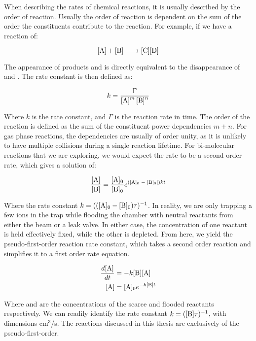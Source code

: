 When describing the rates of chemical reactions, it is usually described by the order of reaction. Usually the order of reaction is dependent on the sum of the order the constituents contribute to the reaction. For example, if we have a reaction of:

\begin{equation*}
	\ce{[A] + [B] -> [C][D]}
\end{equation*}

The appearance of products \ce{[C]} and \ce{[D]} is directly equivalent to the disappearance of \ce{[A]} and \ce{[B]}. The rate constant is then defined as:

\begin{equation*}
	k = \frac{\Gamma}{\ce{[A]^m [B]^n}}
\end{equation*}

Where $k$ is the rate constant, and $\Gamma$ is the reaction rate in time. The order of the reaction is defined as the sum of the constituent power dependencies $m+n$. For gas phase reactions, the dependencies are usually of order unity, as it is unlikely to have multiple collisions during a single reaction lifetime. For bi-molecular reactions that we are exploring, we would expect the rate to be a second order rate, which gives a solution of:

\begin{equation*}
	\frac{\ce{[A]}}{\ce{[B]}} = \frac{\ce{[A]0}}{\ce{[B]0}}e^{(\ce{[A]0 - [B]0}])kt}
\end{equation*}

Where the rate constant $k=((\ce{[A]0 - [B]0})\tau)^{-1}$. In reality, we are only trapping a few ions in the trap while flooding the chamber with neutral reactants from either the beam or a leak valve. In either case, the concentration of one reactant is held effectively fixed, while the other is depleted. From here, we yield the pseudo-first-order reaction rate constant, which takes a second order reaction and simplifies it to a first order rate equation.

\begin{align}
	\frac{d\ce{[A]}}{dt} & = - k \ce{[B]} \ce{[A]} \nonumber \\
	\ce{[A]} & = \ce{[A]_0}e^{-k\ce{[B]}t}
\end{align}

Where \ce{[A]} and \ce{[B]} are the concentrations of the scarce and flooded reactants respectively. We can readily identify the rate constant $k=(\ce{[B]}\tau)^{-1}$, with dimensions cm$^3$/s. The reactions discussed in this thesis are exclusively of the pseudo-first-order.

